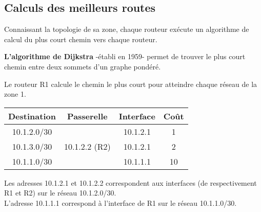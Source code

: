 \documentclass[a4paper,11pt]{article}
\begin{document}
\subsection{Calculs des meilleurs routes}
Connaissant la topologie de sa zone, chaque routeur exécute un algorithme de calcul du plus court chemin vers chaque routeur.
\begin{aretenir}[]
\textbf{L'algorithme de Dijkstra} -établi en 1959- permet de trouver le plus court chemin entre deux sommets d'un graphe pondéré.
\end{aretenir}
\begin{center}
    \label{zone1}
\end{center}
Le routeur R1 calcule le chemin le plus court pour atteindre chaque réseau de la zone 1.
\begin{center}
    \begin{tabular}{|*{4}{c|}}
        \hline
        Destination & Passerelle & Interface & Coût \\
        \hline
        10.1.2.0/30 &  & 10.1.2.1 & 1 \\
        \hline
        10.1.3.0/30 & 10.1.2.2 (R2) & 10.1.2.1 & 2 \\
        \hline
        10.1.1.0/30 &  & 10.1.1.1 & 10 \\
        \hline
    \end{tabular}
\end{center}
\begin{aretenir}[Remarque]
Les adresses 10.1.2.1 et 10.1.2.2 correspondent aux interfaces (de respectivement R1 et R2) sur le réseau 10.1.2.0/30.\\
L'adresse 10.1.1.1 correspond à l'interface de R1 sur le réseau 10.1.1.0/30.
\end{aretenir}
\end{document}
